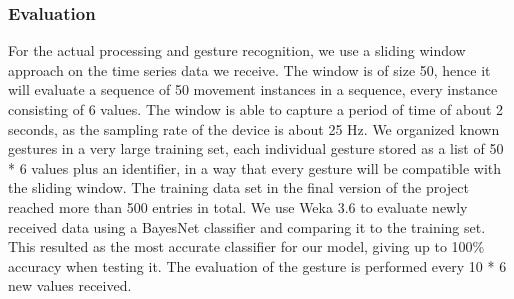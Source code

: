 \subsubsection{Evaluation}
For the actual processing and gesture recognition, we use a sliding window approach on the time series data we receive.
The window is of size 50, hence it will evaluate a sequence of 50 movement instances in a sequence,
every instance consisting of 6 values.
The window is able to capture a period of time of about 2 seconds, as the sampling rate of the device is about 25 Hz.
We organized known gestures in a very large training set, each individual gesture stored as a list of 50 * 6 values plus an identifier, in a way that every gesture will be compatible with the sliding window. 
The training data set in the final version of the project reached more than 500 entries in total.
We use Weka 3.6 to evaluate newly received data using a BayesNet classifier and comparing it to the training set. 
This resulted as the most accurate classifier for our model, giving up to 100\% accuracy when testing it.
The evaluation of the gesture is performed every 10 * 6 new values received.









